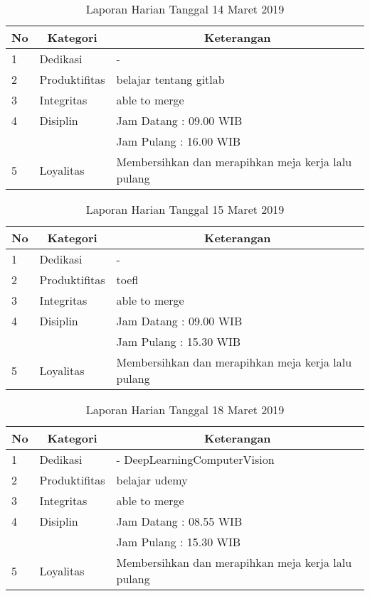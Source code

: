 \begin{table}[htp]
\caption{Laporan Harian Tanggal 14 Maret 2019}
\label{tab:lh140319}
\begin{tabular}{|l|l|l|}
\hline
\textbf{No} & \multicolumn{1}{c|}{\textbf{Kategori}} & \multicolumn{1}{c|}{\textbf{Keterangan}} \\ \hline
1 & Dedikasi & - \\ \hline
2 & Produktifitas & belajar tentang gitlab \\
3 & Integritas & able to merge \\ \hline
4 & Disiplin & Jam Datang : 09.00 WIB \\
 &  & Jam Pulang : 16.00 WIB \\ \hline
5 & Loyalitas & Membersihkan dan merapihkan meja kerja lalu pulang  \\ \hline
\end{tabular}
\end{table}

\begin{table}[htp]
\caption{Laporan Harian Tanggal 15 Maret 2019}
\label{tab:lh150319}
\begin{tabular}{|l|l|l|}
\hline
\textbf{No} & \multicolumn{1}{c|}{\textbf{Kategori}} & \multicolumn{1}{c|}{\textbf{Keterangan}} \\ \hline
1 & Dedikasi & - \\ \hline
2 & Produktifitas & toefl \\
3 & Integritas & able to merge \\ \hline
4 & Disiplin & Jam Datang : 09.00 WIB \\
 &  & Jam Pulang : 15.30 WIB \\ \hline
5 & Loyalitas & Membersihkan dan merapihkan meja kerja lalu pulang  \\ \hline
\end{tabular}
\end{table}

\begin{table}[htp]
\caption{Laporan Harian Tanggal 18 Maret 2019}
\label{tab:lh180319}
\begin{tabular}{|l|l|l|}
\hline
\textbf{No} & \multicolumn{1}{c|}{\textbf{Kategori}} & \multicolumn{1}{c|}{\textbf{Keterangan}} \\ \hline
1 & Dedikasi & -  DeepLearningComputerVision \\ \hline
2 & Produktifitas & belajar udemy \\
3 & Integritas & able to merge \\ \hline
4 & Disiplin & Jam Datang : 08.55 WIB \\
 &  & Jam Pulang : 15.30 WIB \\ \hline
5 & Loyalitas & Membersihkan dan merapihkan meja kerja lalu pulang  \\ \hline
\end{tabular}
\end{table}

